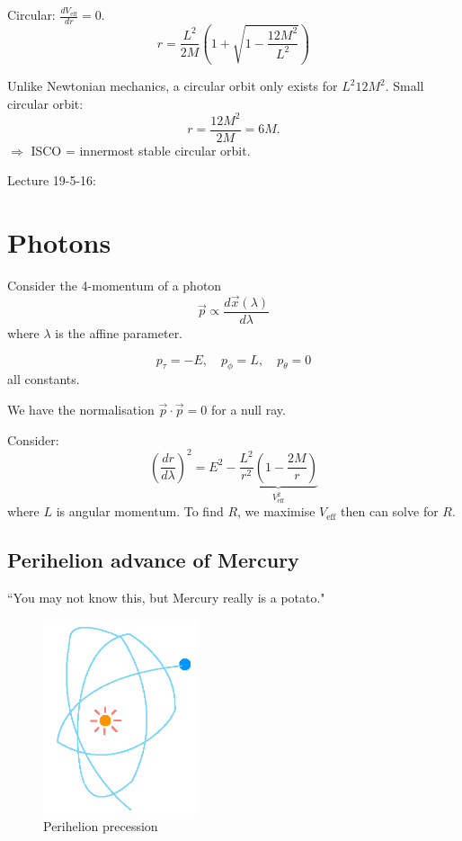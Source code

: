 \documentclass[a4paper]{article} %
\begin{document}
Circular: $\frac{dV_{\text{eff}}}{dr}=0$.
\begin{equation}
r=\frac{L^2}{2M}\left(1+\sqrt{1-\frac{12M^2}{L^2}}\right)
\end{equation}

Unlike Newtonian mechanics, a circular orbit only exists for $L^2 12M^2$. Small circular orbit:
\begin{equation}
r=\frac{12M^2}{2M}=6M.
\end{equation}
$\Rightarrow$ ISCO = innermost stable circular orbit.

\HRule

Lecture 19-5-16:

\section{Photons}

Consider the 4-momentum of a photon
\begin{equation}
\vec{p} \propto \frac{d\vec{x}(\lambda)}{d\lambda}
\end{equation}
where $\lambda$ is the affine parameter.

\begin{equation}
p_\tau = -E,\quad p_{\phi}=L,\quad p_{\theta}=0
\end{equation}
all constants.

We have the normalisation $\vec{p}\cdot \vec{p}=0$ for a null ray.

Consider:
\begin{equation}
\left(\frac{dr}{d\lambda}\right)^2=E^2 - \underbrace{\frac{L^2}{r^2}\left(1-\frac{2M}{r}\right)}_{V_{\text{eff}}^2}
\end{equation}
where $L$ is angular momentum. To find $R$, we maximise $V_{\text{eff}}$ then can solve for $R$.


\HRule


\subsection{Perihelion advance of Mercury}


``You may not know this, but Mercury really is a potato."

\begin{figure}[h]
\centering
\includegraphics[width=0.4\textwidth]{images/perihelion-of-mercury.png}
\caption{Perihelion precession}
\end{figure}
\end{document}
